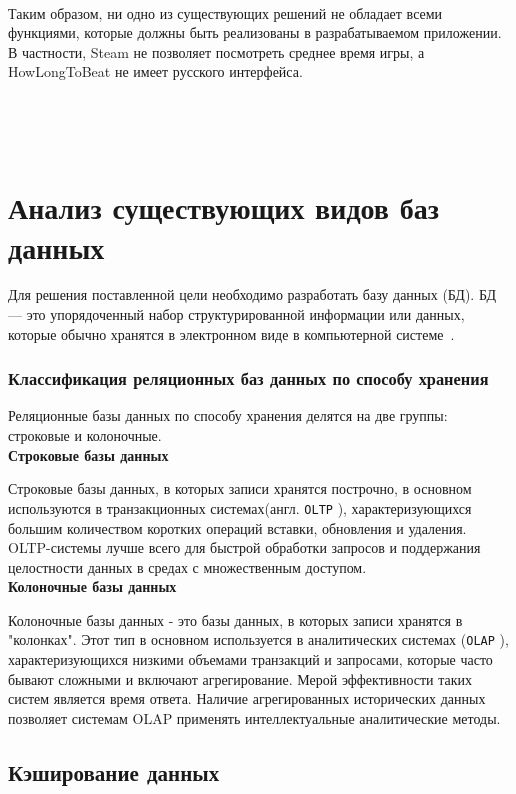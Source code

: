 ~

Таким образом, ни одно из существующих решений не обладает всеми функциями, которые должны быть реализованы в разрабатываемом приложении. В частности, Steam не позволяет посмотреть среднее время игры, а HowLongToBeat не имеет русского интерфейса.

~

~

\section{Анализ существующих видов баз данных} 

Для решения поставленной цели необходимо разработать базу данных (БД). БД --- это упорядоченный набор структурированной информации или данных, которые обычно хранятся в электронном виде в компьютерной системе~\cite{database}.

\subsubsection{Классификация реляционных баз данных по способу хранения}

Реляционные базы данных по способу хранения делятся на две группы: строковые и колоночные.\\

\noindent\textbf{Строковые базы данных}

Строковые базы данных, в которых записи хранятся построчно, в основном используются в транзакционных системах(англ. \texttt{OLTP} \cite{OLTP}), характеризующихся большим количеством коротких операций вставки, обновления и удаления. OLTP-системы лучше всего для быстрой обработки запросов и поддержания целостности данных в средах с множественным доступом.\\

\noindent\textbf{Колоночные базы данных}

Колоночные базы данных - это базы данных, в которых записи хранятся в "колонках". Этот тип в основном используется в аналитических системах (\texttt{OLAP} \cite{olap}), характеризующихся низкими объемами транзакций и запросами, которые часто бывают сложными и включают агрегирование. Мерой эффективности таких систем является время ответа. Наличие агрегированных исторических данных позволяет системам OLAP применять интеллектуальные аналитические методы.

\subsection{Кэширование данных}

